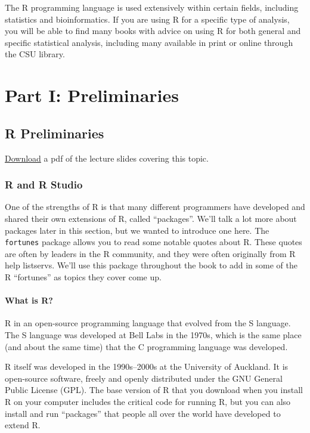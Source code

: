 \documentclass[]{book}
\makeatletter
\newenvironment{kframe}{%
\medskip{}
\setlength{\fboxsep}{.8em}
 \def\at@end@of@kframe{}%
 \ifinner\ifhmode%
  \def\at@end@of@kframe{\end{minipage}}%
  \begin{minipage}{\columnwidth}%
 \fi\fi%
 \def\FrameCommand##1{\hskip\@totalleftmargin \hskip-\fboxsep
 \colorbox{shadecolor}{##1}\hskip-\fboxsep
     \hskip-\linewidth \hskip-\@totalleftmargin \hskip\columnwidth}%
 \MakeFramed {\advance\hsize-\width
   \@totalleftmargin\z@ \linewidth\hsize
   \@setminipage}}%
 {\par\unskip\endMakeFramed%
 \at@end@of@kframe}
\newenvironment{rmdblock}[1]
  {
  \begin{itemize}
  \renewcommand{\labelitemi}{
    \raisebox{-.7\height}[0pt][0pt]{
      {\setkeys{Gin}{width=3em,keepaspectratio}\texttt{[image: images/\#1]}}
    }
  }
  \setlength{\fboxsep}{1em}
  \begin{kframe}
  \item
  }
  {
  \end{kframe}
  \end{itemize}
  }
\newenvironment{rmdtip}
  {\begin{rmdblock}{tip}}
  {\end{rmdblock}}
\theoremstyle{definition}
\theoremstyle{definition}
\theoremstyle{definition}
\theoremstyle{remark}
\makeatother
\begin{document}
The R programming language is used extensively within certain fields,
including statistics and bioinformatics. If you are using R for a
specific type of analysis, you will be able to find many books with
advice on using R for both general and specific statistical analysis,
including many available in print or online through the CSU library.

\part{Part I: Preliminaries}\label{part-part-i-preliminaries}

\chapter{R Preliminaries}\label{r-preliminaries}

\href{https://github.com/geanders/RProgrammingForResearch/raw/master/slides/CourseNotes_Week1.pdf}{Download}
a pdf of the lecture slides covering this topic.

\section{R and R Studio}\label{r-and-r-studio}

\begin{rmdtip}
One of the strengths of R is that many different programmers have
developed and shared their own extensions of R, called ``packages''.
We'll talk a lot more about packages later in this section, but we
wanted to introduce one here. The \texttt{fortunes} package allows you
to read some notable quotes about R. These quotes are often by leaders
in the R community, and they were often originally from R help
listservs. We'll use this package throughout the book to add in some of
the R ``fortunes'' as topics they cover come up.
\end{rmdtip}

\subsection{What is R?}\label{what-is-r}

R in an open-source programming language that evolved from the S
language. The S language was developed at Bell Labs in the 1970s, which
is the same place (and about the same time) that the C programming
language was developed.

R itself was developed in the 1990s--2000s at the University of
Auckland. It is open-source software, freely and openly distributed
under the GNU General Public License (GPL). The base version of R that
you download when you install R on your computer includes the critical
code for running R, but you can also install and run ``packages'' that
people all over the world have developed to extend R.
\end{document}
